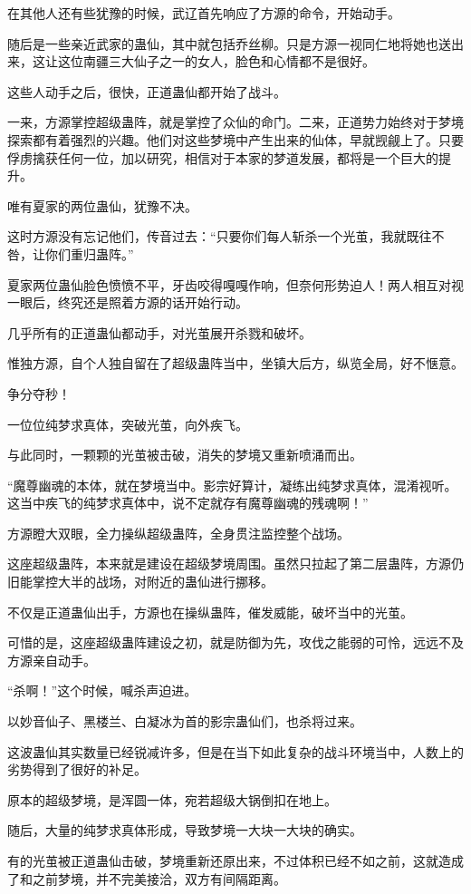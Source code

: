 \begin{this_body}
在其他人还有些犹豫的时候，武辽首先响应了方源的命令，开始动手。

随后是一些亲近武家的蛊仙，其中就包括乔丝柳。只是方源一视同仁地将她也送出来，这让这位南疆三大仙子之一的女人，脸色和心情都不是很好。

这些人动手之后，很快，正道蛊仙都开始了战斗。

一来，方源掌控超级蛊阵，就是掌控了众仙的命门。二来，正道势力始终对于梦境探索都有着强烈的兴趣。他们对这些梦境中产生出来的仙体，早就觊觎上了。只要俘虏擒获任何一位，加以研究，相信对于本家的梦道发展，都将是一个巨大的提升。

唯有夏家的两位蛊仙，犹豫不决。

这时方源没有忘记他们，传音过去：“只要你们每人斩杀一个光茧，我就既往不咎，让你们重归蛊阵。”

夏家两位蛊仙脸色愤愤不平，牙齿咬得嘎嘎作响，但奈何形势迫人！两人相互对视一眼后，终究还是照着方源的话开始行动。

几乎所有的正道蛊仙都动手，对光茧展开杀戮和破坏。

惟独方源，自个人独自留在了超级蛊阵当中，坐镇大后方，纵览全局，好不惬意。

争分夺秒！

一位位纯梦求真体，突破光茧，向外疾飞。

与此同时，一颗颗的光茧被击破，消失的梦境又重新喷涌而出。

“魔尊幽魂的本体，就在梦境当中。影宗好算计，凝练出纯梦求真体，混淆视听。这当中疾飞的纯梦求真体中，说不定就存有魔尊幽魂的残魂啊！”

方源瞪大双眼，全力操纵超级蛊阵，全身贯注监控整个战场。

这座超级蛊阵，本来就是建设在超级梦境周围。虽然只拉起了第二层蛊阵，方源仍旧能掌控大半的战场，对附近的蛊仙进行挪移。

不仅是正道蛊仙出手，方源也在操纵蛊阵，催发威能，破坏当中的光茧。

可惜的是，这座超级蛊阵建设之初，就是防御为先，攻伐之能弱的可怜，远远不及方源亲自动手。

“杀啊！”这个时候，喊杀声迫进。

以妙音仙子、黑楼兰、白凝冰为首的影宗蛊仙们，也杀将过来。

这波蛊仙其实数量已经锐减许多，但是在当下如此复杂的战斗环境当中，人数上的劣势得到了很好的补足。

原本的超级梦境，是浑圆一体，宛若超级大锅倒扣在地上。

随后，大量的纯梦求真体形成，导致梦境一大块一大块的确实。

有的光茧被正道蛊仙击破，梦境重新还原出来，不过体积已经不如之前，这就造成了和之前梦境，并不完美接洽，双方有间隔距离。


\end{this_body}
